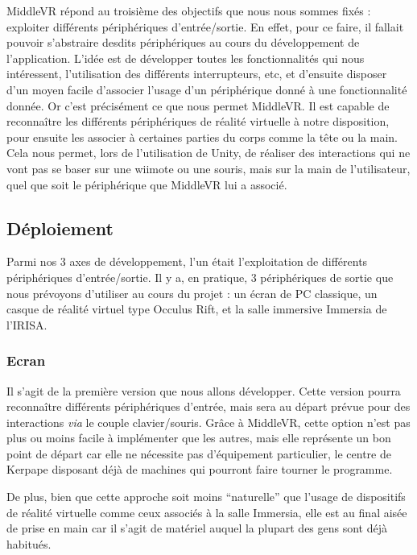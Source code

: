 MiddleVR répond au troisième des objectifs que nous nous sommes fixés : exploiter différents périphériques d'entrée/sortie. En effet, pour ce faire, il fallait pouvoir s'abstraire desdits périphériques au cours du développement de l'application. L'idée est de développer toutes les fonctionnalités qui nous intéressent, l'utilisation des différents interrupteurs, etc, et d'ensuite disposer d'un moyen facile d'associer l'usage d'un périphérique donné à une fonctionnalité donnée.\newline
Or c'est précisément ce que nous permet MiddleVR. Il est capable de reconnaître les différents périphériques de réalité virtuelle à notre disposition, pour ensuite les associer à certaines parties du corps comme la tête ou la main. Cela nous permet, lors de l'utilisation de Unity, de réaliser des interactions qui ne vont pas se  baser sur une wiimote ou une souris, mais sur la main de l'utilisateur, quel que soit le périphérique que MiddleVR lui a associé. 

\subsection{Déploiement}
Parmi nos 3 axes de développement, l'un était l'exploitation de différents périphériques d'entrée/sortie. Il y a, en pratique, 3 périphériques de sortie que nous prévoyons d'utiliser au cours du projet : un écran de PC classique, un casque de réalité virtuel type Occulus Rift, et la salle immersive Immersia de l'IRISA.

\subsubsection{Ecran}
Il s'agit de la première version que nous allons développer. Cette version pourra reconnaître différents périphériques d'entrée, mais sera au départ prévue pour des interactions \textit{via} le couple clavier/souris. Grâce à MiddleVR, cette option n'est pas plus ou moins facile à implémenter que les autres, mais elle représente un bon point de départ car elle ne nécessite pas d'équipement particulier, le centre de Kerpape disposant déjà de machines qui pourront faire tourner le programme. \newline

De  plus, bien que cette approche soit moins \enquote{naturelle} que l'usage de dispositifs de réalité virtuelle comme ceux associés à la salle Immersia, elle est au final aisée de prise en main car il s'agit de matériel auquel la plupart des gens sont déjà habitués.

